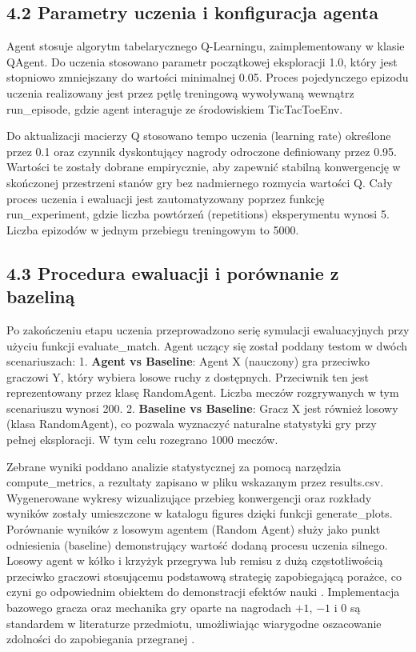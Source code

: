 \documentclass[conference]{IEEEtran}
\begin{document}
\subsection{4.2 Parametry uczenia i konfiguracja agenta}
Agent stosuje algorytm tabelarycznego Q-Learningu, zaimplementowany w klasie QAgent. Do uczenia stosowano parametr początkowej eksploracji 1.0, który jest stopniowo zmniejszany do wartości minimalnej 0.05. Proces pojedynczego epizodu uczenia realizowany jest przez pętlę treningową wywoływaną wewnątrz run\_episode, gdzie agent interaguje ze środowiskiem TicTacToeEnv.

Do aktualizacji macierzy Q stosowano tempo uczenia (learning rate) określone przez 0.1 oraz czynnik dyskontujący nagrody odroczone definiowany przez 0.95. Wartości te zostały dobrane empirycznie, aby zapewnić stabilną konwergencję w skończonej przestrzeni stanów gry bez nadmiernego rozmycia wartości Q. Cały proces uczenia i ewaluacji jest zautomatyzowany poprzez funkcję run\_experiment, gdzie liczba powtórzeń (repetitions) eksperymentu wynosi 5. Liczba epizodów w jednym przebiegu treningowym to 5000.

\subsection{4.3 Procedura ewaluacji i porównanie z bazeliną}
Po zakończeniu etapu uczenia przeprowadzono serię symulacji ewaluacyjnych przy użyciu funkcji evaluate\_match. Agent uczący się został poddany testom w dwóch scenariuszach:
1. \textbf{Agent vs Baseline}: Agent X (nauczony) gra przeciwko graczowi Y, który wybiera losowe ruchy z dostępnych. Przeciwnik ten jest reprezentowany przez klasę RandomAgent. Liczba meczów rozgrywanych w tym scenariuszu wynosi 200.
2. \textbf{Baseline vs Baseline}: Gracz X jest również losowy (klasa RandomAgent), co pozwala wyznaczyć naturalne statystyki gry przy pełnej eksploracji. W tym celu rozegrano 1000 meczów.

Zebrane wyniki poddano analizie statystycznej za pomocą narzędzia compute\_metrics, a rezultaty zapisano w pliku wskazanym przez results.csv. Wygenerowane wykresy wizualizujące przebieg konwergencji oraz rozkłady wyników zostały umieszczone w katalogu figures dzięki funkcji generate\_plots. Porównanie wyników z losowym agentem (Random Agent) służy jako punkt odniesienia (baseline) demonstrujący wartość dodaną procesu uczenia silnego. Losowy agent w kółko i krzyżyk przegrywa lub remisu z dużą częstotliwością przeciwko graczowi stosującemu podstawową strategię zapobiegającą porażce, co czyni go odpowiednim obiektem do demonstracji efektów nauki \cite{hwang2023practical}. Implementacja bazowego gracza oraz mechanika gry oparte na nagrodach $+1$, $-1$ i $0$ są standardem w literaturze przedmiotu, umożliwiając wiarygodne oszacowanie zdolności do zapobiegania przegranej \cite{amiri2025reinforcemen}.
\end{document}
